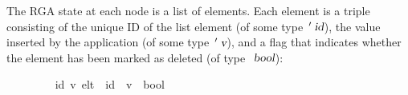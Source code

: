 The RGA state at each node is a list of elements.
Each element is a triple consisting of the unique ID of the list element (of some type $\isacharprime\isa{id}$), the value inserted by the application (of some type $\isacharprime\isa{v}$), and a flag that indicates whether the element has been marked as deleted (of type $\isa{bool}$):
\vspace{0.35em}
\begin{isabellebody}
\ \ \ \ \ \ \ \  {\isacharparenleft}{\isacharprime}id{\isacharcomma}\ {\isacharprime}v{\isacharparenright}\ elt\ {\isacharequal}\ {\isachardoublequoteopen}{\isacharprime}id\ {\isasymtimes}\ {\isacharprime}v\ {\isasymtimes}\ bool{\isachardoublequoteclose}%
\end{isabellebody}
\vspace{0.35em}

